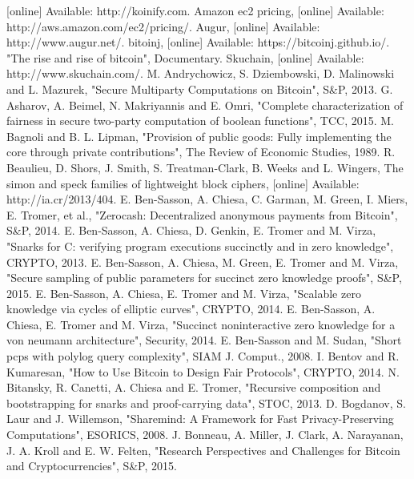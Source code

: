 \documentclass{xduugtrans}
\begin{document}
\begin{thebibliography}{99}  
     [online] Available: http://koinify.com.
     Amazon ec2 pricing, [online] Available: http://aws.amazon.com/ec2/pricing/.
     Augur, [online] Available: http://www.augur.net/.
     bitoinj, [online] Available: https://bitcoinj.github.io/.
     "The rise and rise of bitcoin", Documentary.
     Skuchain, [online] Available: http://www.skuchain.com/.
     M. Andrychowicz, S. Dziembowski, D. Malinowski and L. Mazurek, "Secure Multiparty Computations on Bitcoin", S\&P, 2013.
     G. Asharov, A. Beimel, N. Makriyannis and E. Omri, "Complete characterization of fairness in secure two-party computation of boolean functions", TCC, 2015.
     M. Bagnoli and B. L. Lipman, "Provision of public goods: Fully implementing the core through private contributions", The Review of Economic Studies, 1989.
     R. Beaulieu, D. Shors, J. Smith, S. Treatman-Clark, B. Weeks and L. Wingers, The simon and speck families of lightweight block ciphers, [online] Available: http://ia.cr/2013/404.
     E. Ben-Sasson, A. Chiesa, C. Garman, M. Green, I. Miers, E. Tromer, et al., "Zerocash: Decentralized anonymous payments from Bitcoin", S\&P, 2014.
     E. Ben-Sasson, A. Chiesa, D. Genkin, E. Tromer and M. Virza, "Snarks for C: verifying program executions succinctly and in zero knowledge", CRYPTO, 2013.
     E. Ben-Sasson, A. Chiesa, M. Green, E. Tromer and M. Virza, "Secure sampling of public parameters for succinct zero knowledge proofs", S\&P, 2015.
     E. Ben-Sasson, A. Chiesa, E. Tromer and M. Virza, "Scalable zero knowledge via cycles of elliptic curves", CRYPTO, 2014.
     E. Ben-Sasson, A. Chiesa, E. Tromer and M. Virza, "Succinct noninteractive zero knowledge for a von neumann architecture", Security, 2014.
     E. Ben-Sasson and M. Sudan, "Short pcps with polylog query complexity", SIAM J. Comput., 2008.
     I. Bentov and R. Kumaresan, "How to Use Bitcoin to Design Fair Protocols", CRYPTO, 2014.
     N. Bitansky, R. Canetti, A. Chiesa and E. Tromer, "Recursive composition and bootstrapping for snarks and proof-carrying data", STOC, 2013.
     D. Bogdanov, S. Laur and J. Willemson, "Sharemind: A Framework for Fast Privacy-Preserving Computations", ESORICS, 2008.
     J. Bonneau, A. Miller, J. Clark, A. Narayanan, J. A. Kroll and E. W. Felten, "Research Perspectives and Challenges for Bitcoin and Cryptocurrencies", S\&P, 2015.

\end{thebibliography}
\end{document}
